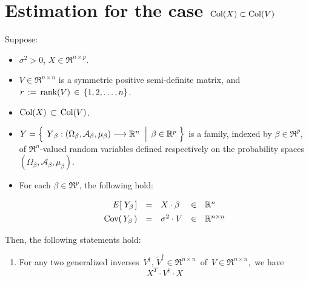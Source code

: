 

\section{Estimation for the case $\textnormal{Col}(X) \subset \textnormal{Col}(V)$}
\setcounter{theorem}{0}
\setcounter{equation}{0}

\renewcommand{\theenumi}{\roman{enumi}}
\renewcommand{\labelenumi}{\textnormal{(\theenumi)}$\;\;$}


\begin{theorem}
\mbox{}
\vskip 0.1cm
\noindent
Suppose:
\begin{itemize}
\item
	$\sigma^{2} > 0$,
	$X \in \Re^{n \times p}$.
\item
	$V \in \Re^{n \times n}$ is a symmetric positive semi-definite matrix, and
	\,$r \,:=\, \textnormal{rank}(V) \,\in\, \{1,2,\ldots,n\}$.
\item
	{\color{red}$\textnormal{Col}(X) \,\subset\, \textnormal{Col}(V)$}.
\item
	$Y = \left\{\;
		\left.
		\overset{{\color{white}.}}{Y}_{\beta} : (\Omega_{\beta},\mathcal{A}_{\beta},\mu_{\beta}) \longrightarrow \Re^{n}
		\;\;\right\vert\;
		\beta \in \Re^{p}
		\;\right\}$
	is a family, indexed by $\beta \in \Re^{p}$,
	of $\Re^{n}$-valued random variables defined respectively on the
	probability spaces $(\Omega_{\beta},\mathcal{A}_{\beta},\mu_{\beta})$.
\item
	For each $\beta \in \Re^{p}$, the following hold:
	\begin{equation*}
	\begin{array}{rclcl}
	E\!\left[\;Y_{\beta}\,\right] &  \overset{{\color{white}\vert}}{=} & X \cdot \beta & \in & \Re^{n}
	\\
	\Cov\!\left(\,Y_{\beta}\,\right) & \overset{{\color{white}\vert}}{=} & \sigma^{2} \cdot V & \in & \Re^{n \times n}
	\end{array}
	\end{equation*}
\end{itemize}
Then, the following statements hold:
\begin{enumerate}
\item\label{XtVdaggerX}
	For any two generalized inverses
	\,$V^{\dagger},\, \widetilde{V}^{\dagger} \in \Re^{n \times n}$\,
	of \,$V \in \Re^{n \times n}$,\, we have
	\begin{equation*}
	X^{T} \cdot V^{\dagger} \cdot X

\end{equation*}
\end{enumerate}
\end{theorem}
